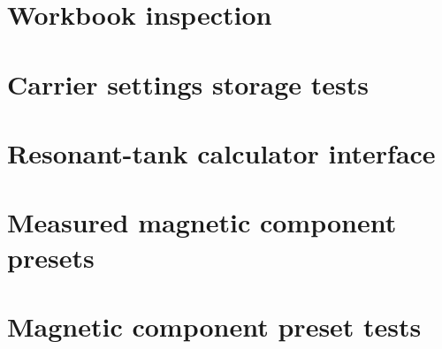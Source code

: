 

\section{Workbook inspection}





\section{Carrier settings storage tests}




\section{Resonant-tank calculator interface}




\section{Measured magnetic component presets}




\section{Magnetic component preset tests}



